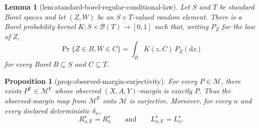 \documentclass{article}
\newtheorem{lemma}{Lemma}
\newtheorem{proposition}{Proposition}
\begin{document}
\begin{lemma}[lem:standard-borel-regular-conditional-law]\label{lem:standard-borel-regular-conditional-law}
Let \(S\) and \(T\) be standard Borel spaces and let \((Z,W)\) be an \(S\times T\)-valued random element.  There is a Borel probability kernel \(K:S\times\mathcal B(T)\to[0,1]\) such that, writing \(P_Z\) for the law of \(Z\),
\[
 \Pr\{Z\in B,W\in C\}=\int_B K(z,C)\,P_Z(\mathrm dz)
\]
for every Borel \(B\subseteq S\) and \(C\subseteq T\).
\end{lemma}

\begin{proposition}[prop:observed-margin-surjectivity]\label{prop:observed-margin-surjectivity}
For every \(P\in\mathcal M\), there exists \(P^{\mathrm F}\in\mathcal M^{\mathrm F}\) whose observed \((X,A,Y)\)-margin is exactly \(P\).  Thus the observed-margin map from \(\mathcal M^{\mathrm F}\) onto \(\mathcal M\) is surjective.  Moreover, for every \(n\) and every declared deterministic \(\delta_n\),
\[
 R_{n,\mathrm F}^\star=R_n^\star
 \qquad\text{and}\qquad
 L_{n,\mathrm F}^\star=L_n^\star.
\]
\end{proposition}
\end{document}
